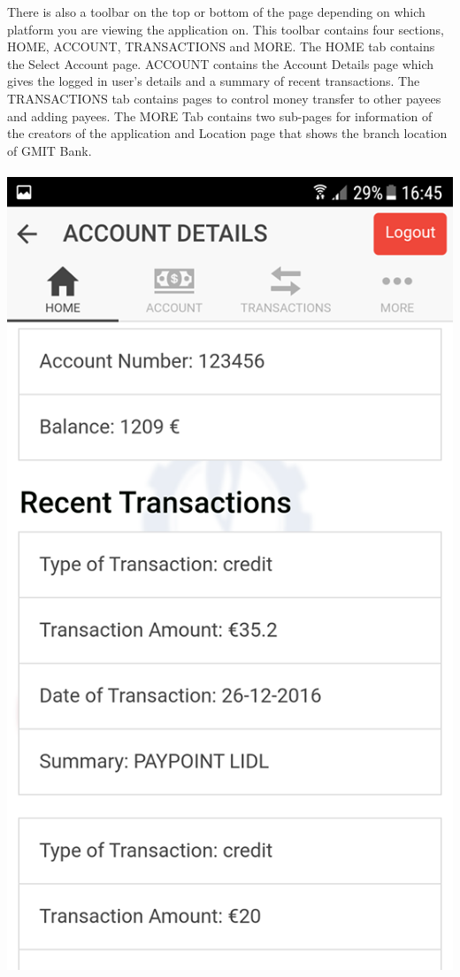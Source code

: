  There is also a toolbar on the top or bottom of the page depending on which platform you are viewing the application on. This toolbar contains four sections, HOME, ACCOUNT, TRANSACTIONS and MORE. The HOME tab contains the Select Account page. ACCOUNT contains the Account Details page which gives the logged in user’s details and a summary of recent transactions. The TRANSACTIONS tab contains pages to control money transfer to other payees and adding payees. The MORE Tab contains two sub-pages for information of the creators of the application and Location page that shows the branch location of GMIT Bank.
\paragraph{}

\begin{center}
    \includegraphics[scale=0.5]{img/8homepagetransactions.png}
\end{center}

